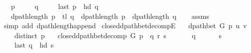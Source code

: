 \begin{isabellebody}
\ \ \ {\isachardoublequoteopen}p\ {\isasymnoteq}\ {\isacharbrackleft}{\kern0pt}{\isacharbrackright}{\kern0pt}{\isachardoublequoteclose}\isanewline
\ \ \ {\isachardoublequoteopen}q\ {\isasymnoteq}\ {\isacharbrackleft}{\kern0pt}{\isacharbrackright}{\kern0pt}{\isachardoublequoteclose}\isanewline
\ \ \ {\isachardoublequoteopen}last\ p\ {\isacharequal}{\kern0pt}\ hd\ q{\isachardoublequoteclose}\isanewline
\ \ \ {\isachardoublequoteopen}dpath{\isacharunderscore}{\kern0pt}length\ {\isacharparenleft}{\kern0pt}p\ {\isacharat}{\kern0pt}\ tl\ q{\isacharparenright}{\kern0pt}\ {\isacharequal}{\kern0pt}\ dpath{\isacharunderscore}{\kern0pt}length\ p\ {\isacharplus}{\kern0pt}\ dpath{\isacharunderscore}{\kern0pt}length\ q{\isachardoublequoteclose}%
\endisataginvisible
{\isafoldinvisible}%
%
\isadeliminvisible
\isanewline
%
\endisadeliminvisible
%
\isadelimproof
\ \ %
\endisadelimproof
%
\isatagproof
{}\isamarkupfalse%
\ assms\isanewline
\ \ \isamarkupfalse%
\ {\isacharparenleft}{\kern0pt}simp\ add{\isacharcolon}{\kern0pt}\ dpath{\isacharunderscore}{\kern0pt}length{\isacharunderscore}{\kern0pt}append{\isacharparenright}{\kern0pt}%
\endisatagproof
{\isafoldproof}%
%
\isadelimproof
\isanewline
%
\endisadelimproof
%
\isadeliminvisible
\isanewline
%
\endisadeliminvisible
%
\isataginvisible
{}\isamarkupfalse%
\ closed{\isacharunderscore}{\kern0pt}dpath{\isacharunderscore}{\kern0pt}bet{\isacharunderscore}{\kern0pt}decompE{\isacharunderscore}{\kern0pt}{}{\isacharcolon}{\kern0pt}\isanewline
\ \ \ {\isachardoublequoteopen}dpath{\isacharunderscore}{\kern0pt}bet\ G\ p\ u\ v{\isachardoublequoteclose}\isanewline
\ \ \ {\isachardoublequoteopen}{\isasymnot}\ distinct\ p{\isachardoublequoteclose}\isanewline
\ \ \ {\isachardoublequoteopen}closed{\isacharunderscore}{\kern0pt}dpath{\isacharunderscore}{\kern0pt}bet{\isacharunderscore}{\kern0pt}decomp\ G\ p\ {\isacharequal}{\kern0pt}\ {\isacharparenleft}{\kern0pt}q{\isacharcomma}{\kern0pt}\ r{\isacharcomma}{\kern0pt}\ s{\isacharparenright}{\kern0pt}{\isachardoublequoteclose}\isanewline
\ \ \isanewline
\ \ \ \ {\isachardoublequoteopen}q\ {\isasymnoteq}\ {\isacharbrackleft}{\kern0pt}{\isacharbrackright}{\kern0pt}{\isachardoublequoteclose}\isanewline
\ \ \ \ {\isachardoublequoteopen}s\ {\isasymnoteq}\ {\isacharbrackleft}{\kern0pt}{\isacharbrackright}{\kern0pt}{\isachardoublequoteclose}\isanewline
\ \ \ \ {\isachardoublequoteopen}last\ q\ {\isacharequal}{\kern0pt}\ hd\ s{\isachardoublequoteclose}%

\end{isabellebody}
